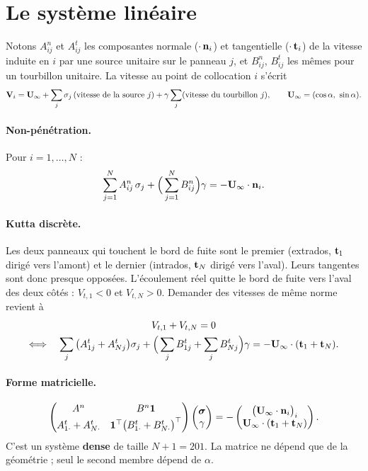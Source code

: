 \section{Le système linéaire}
Notons $A^n_{ij}$ et $A^t_{ij}$ les composantes normale ($\cdot\,\mathbf{n}_i$) et tangentielle ($\cdot\,\mathbf{t}_i$) de la vitesse induite en $i$ par une source unitaire sur le panneau $j$, et $B^n_{ij}$, $B^t_{ij}$ les mêmes pour un tourbillon unitaire. La vitesse au point de collocation $i$ s'écrit
\[
\mathbf{V}_i=\mathbf{U}_\infty+\sum_j\sigma_j\,(\text{vitesse de la source }j)+\gamma\sum_j(\text{vitesse du tourbillon }j),
\qquad \mathbf{U}_\infty=(\cos\alpha,\ \sin\alpha).
\]

\paragraph{Non-pénétration.} Pour $i=1,\dots,N$ :
\[
\sum_{j=1}^N A^n_{ij}\,\sigma_j+\Big(\sum_{j=1}^N B^n_{ij}\Big)\gamma=-\mathbf{U}_\infty\cdot\mathbf{n}_i .
\]

\paragraph{Kutta discrète.} Les deux panneaux qui touchent le bord de fuite sont le premier (extrados, $\mathbf{t}_1$ dirigé vers l'amont) et le dernier (intrados, $\mathbf{t}_N$ dirigé vers l'aval). Leurs tangentes sont donc presque opposées. L'écoulement réel quitte le bord de fuite vers l'aval des deux côtés : $V_{t,1}<0$ et $V_{t,N}>0$. Demander des vitesses de même norme revient à
\begin{gather*}
V_{t,1}+V_{t,N}=0\\
\Longleftrightarrow\quad
\sum_j\big(A^t_{1j}+A^t_{Nj}\big)\sigma_j+\Big(\sum_jB^t_{1j}+\sum_jB^t_{Nj}\Big)\gamma=-\mathbf{U}_\infty\cdot(\mathbf{t}_1+\mathbf{t}_N).
\end{gather*}

\paragraph{Forme matricielle.}
\[
\begin{pmatrix}
A^n & B^n\mathbf{1}\\[2pt]
A^t_{1\cdot}+A^t_{N\cdot} & \mathbf{1}^\top\big(B^t_{1\cdot}+B^t_{N\cdot}\big)^\top
\end{pmatrix}
\begin{pmatrix}\boldsymbol\sigma\\ \gamma\end{pmatrix}
=-\begin{pmatrix}\big(\mathbf{U}_\infty\cdot\mathbf{n}_i\big)_{i}\\ \mathbf{U}_\infty\cdot(\mathbf{t}_1+\mathbf{t}_N)\end{pmatrix}.
\]
C'est un système \textbf{dense} de taille $N+1=201$. La matrice ne dépend que de la géométrie ; seul le second membre dépend de $\alpha$.

